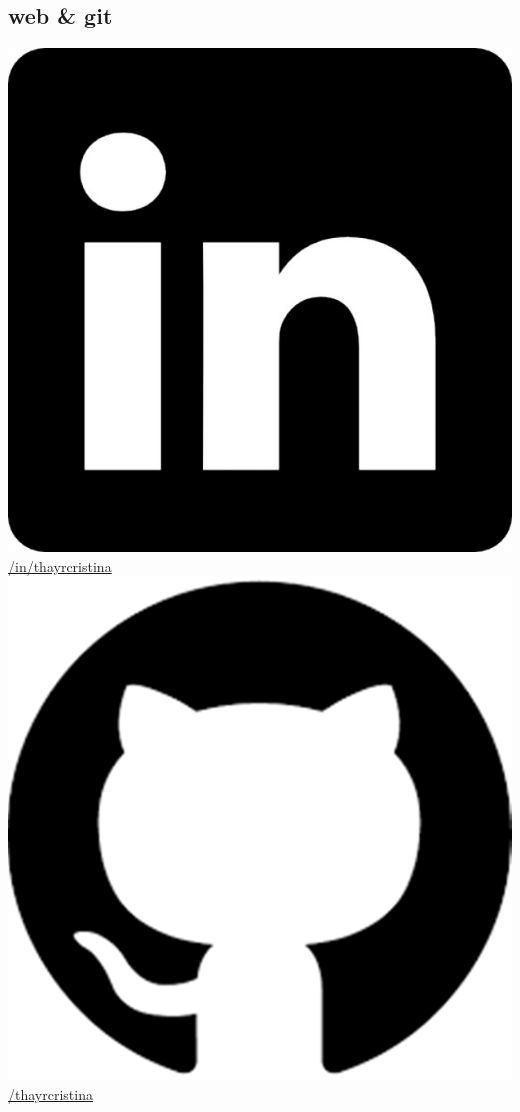 \documentclass[espanol]{cv-style}     %
\begin{document}
\begin{aside}
\section{web \& git}
\href{https://br.linkedin.com/in/thayrcristina}{\includegraphics[scale=0.017]{ln.jpg}\space /in/thayrcristina}
\href{https://github.com/thayrcristina}{\includegraphics[scale=0.023]{github.png}\space /thayrcristina}
~
%

\end{aside}
\end{document}

